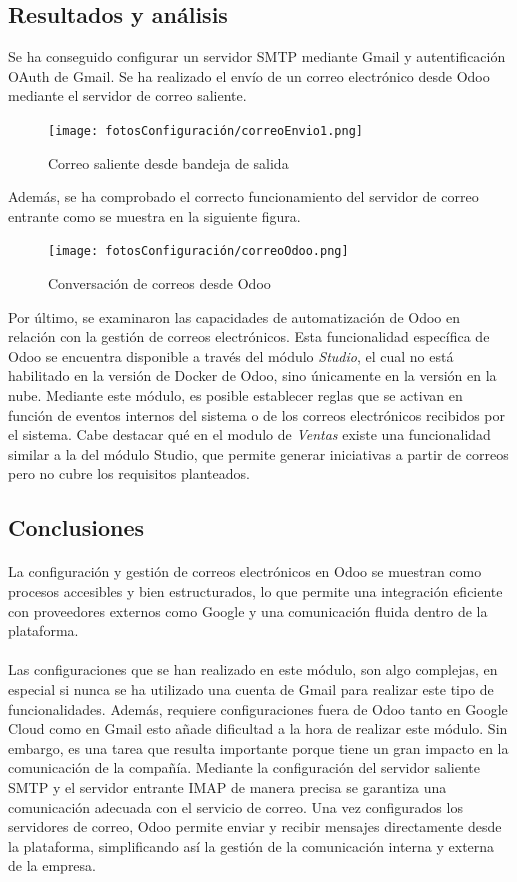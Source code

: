 \subsection{Resultados y análisis}
Se ha conseguido configurar un servidor SMTP mediante Gmail y autentificación OAuth de Gmail. Se ha realizado el envío de un correo electrónico desde Odoo mediante el servidor de correo saliente.
\newpage
\begin{figure}[h]
    \centering
    \texttt{[image: fotosConfiguración/correoEnvio1.png]}
    \caption{Correo saliente desde bandeja de salida}
    \label{fig:enter-label}
\end{figure}
Además, se ha comprobado el correcto funcionamiento del servidor de correo entrante como se muestra en la siguiente figura.
\begin{figure}[h]
    \centering
    \texttt{[image: fotosConfiguración/correoOdoo.png]}
    \caption{Conversación de correos desde Odoo}
    \label{fig:enter-label}
\end{figure}
Por último, se examinaron las capacidades de automatización de Odoo en relación con la gestión de correos electrónicos. Esta funcionalidad específica de Odoo se encuentra disponible a través del módulo \textit{Studio}, el cual no está habilitado en la versión de Docker de Odoo, sino únicamente en la versión en la nube. Mediante este módulo, es posible establecer reglas que se activan en función de eventos internos del sistema o de los correos electrónicos recibidos por el sistema.
Cabe destacar qué en el modulo de \textit{Ventas} existe una funcionalidad similar a la del módulo Studio, que permite generar iniciativas a partir de correos pero no cubre los requisitos planteados.
\subsection{Conclusiones}
\paragraph{}
La configuración y gestión de correos electrónicos en Odoo se muestran como procesos accesibles y bien estructurados, lo que permite una integración eficiente con proveedores externos como Google y una comunicación fluida dentro de la plataforma.
\paragraph{}
Las configuraciones que se han realizado en este módulo, son algo complejas, en especial si nunca se ha utilizado una cuenta de Gmail para realizar este tipo de funcionalidades. Además, requiere configuraciones fuera de Odoo tanto en Google Cloud como en Gmail esto añade dificultad a la hora de realizar este módulo. Sin embargo, es una tarea que resulta importante porque tiene un gran impacto en la comunicación de la compañía. Mediante la configuración del servidor saliente SMTP y el servidor entrante IMAP de manera precisa se garantiza una comunicación adecuada con el servicio de correo. Una vez configurados los servidores de correo, Odoo permite enviar y recibir mensajes directamente desde la plataforma, simplificando así la gestión de la comunicación interna y externa de la empresa.
